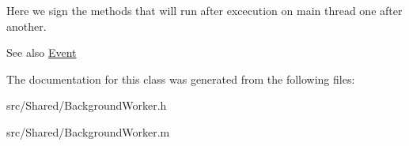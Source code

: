 \-Here we sign the methods that will run after excecution on main thread one after another. 

\begin{DoxySeeAlso}{\-See also}
\hyperlink{interface_event}{\-Event} 
\end{DoxySeeAlso}


\-The documentation for this class was generated from the following files\-:\begin{DoxyCompactItemize}
\item 
src/\-Shared/\-Background\-Worker.\-h\item 
src/\-Shared/\-Background\-Worker.\-m\end{DoxyCompactItemize}
